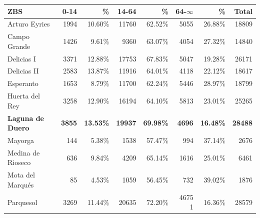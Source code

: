 \begin{table}[H]
    \centering
    \begin{tabular}{lrrrrrrr}
        \toprule
        ZBS                      & 0-14           & \%               & 14-64           & \%               & 64-$\infty$    & \%               & Total            \\
        \midrule
        Arturo Eyries            & 1994           & 10.60\%          & 11760           & 62.52\%          & 5055           & 26.88\%          & 18809            \\
        Campo Grande             & 1426           & 9.61\%           & 9360            & 63.07\%          & 4054           & 27.32\%          & 14840            \\
        Delicias I               & 3371           & 12.88\%          & 17753           & 67.83\%          & 5047           & 19.28\%          & 26171            \\
        Delicias II              & 2583           & 13.87\%          & 11916           & 64.01\%          & 4118           & 22.12\%          & 18617            \\
        Esperanto                & 1653           & 8.79\%           & 11700           & 62.24\%          & 5446           & 28.97\%          & 18799            \\
        Huerta del Rey           & 3258           & 12.90\%          & 16194           & 64.10\%          & 5813           & 23.01\%          & 25265            \\
        \textbf{Laguna de Duero} & \textbf{3855}  & \textbf{13.53\%} & \textbf{19937}  & \textbf{69.98\%} & \textbf{4696}  & \textbf{16.48\%} & \textbf{28488}   \\
        Mayorga                  & 144            & 5.38\%           & 1538            & 57.47\%          & 994            & 37.14\%          & 2676             \\
        Medina de Rioseco        & 636            & 9.84\%           & 4209            & 65.14\%          & 1616           & 25.01\%          & 6461             \\
        Mota del Marqués         & 85             & 4.53\%           & 1059            & 56.45\%          & 732            & 39.02\%          & 1876             \\
        Parquesol                & 3269           & 11.44\%          & 20635           & 72.20\%          & 4675   1       & 16.36\%          & 28579            \\

\end{tabular}
\end{table}
